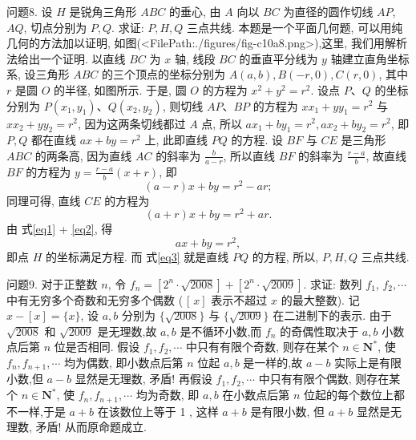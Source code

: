 问题8. 设 $H$ 是锐角三角形 $A B C$ 的垂心, 由 $A$ 向以 $B C$ 为直径的圆作切线 $A P$, $A Q$, 切点分别为 $P, Q$. 求证: $P, H, Q$ 三点共线.
本题是一个平面几何题, 可以用纯几何的方法加以证明, 如图(<FilePath:./figures/fig-c10a8.png>),这里, 我们用解析法给出一个证明.
以直线 $B C$ 为 $x$ 轴, 线段 $B C$ 的垂直平分线为 $y$ 轴建立直角坐标系, 设三角形 $A B C$ 的三个顶点的坐标分别为 $A(a, b), B(-r, 0), C(r, 0)$, 其中 $r$ 是圆 $O$ 的半径, 如图所示.
于是, 圆 $O$ 的方程为 $x^2+y^2=r^2$.
设点 $P 、 Q$ 的坐标分别为 $P\left(x_1, y_1\right) 、 Q\left(x_2, y_2\right)$, 则切线 $A P 、 B P$ 的方程为 $x x_1+y y_1=r^2$ 与 $x x_2+y y_2=r^2$, 因为这两条切线都过 $A$ 点, 所以 $a x_1+ b y_1=r^2, a x_2+b y_2=r^2$, 即 $P, Q$ 都在直线 $a x+b y=r^2$ 上, 此即直线 $P Q$ 的方程.
设 $B F$ 与 $C E$ 是三角形 $A B C$ 的两条高, 因为直线 $A C$ 的斜率为 $\frac{b}{a-r}$, 所以直线 $B F$ 的斜率为 $\frac{r-a}{b}$, 故直线 $B F$ 的方程为 $y=\frac{r-a}{b}(x+r)$, 即
$$
(a-r) x+b y=r^2-a r ; \label{eq1}
$$
同理可得, 直线 $C E$ 的方程为
$$
(a+r) x+b y=r^2+a r . \label{eq2}
$$
由 式\ref{eq1} + \ref{eq2}, 得
$$
a x+b y=r^2, \label{eq3}
$$
即点 $H$ 的坐标满足方程.
而 式\ref{eq3} 就是直线 $P Q$ 的方程, 所以, $P, H, Q$ 三点共线.



问题9. 对于正整数 $n$, 令 $f_n=\left[2^n \cdot \sqrt{2008}\right]+\left[2^n \cdot \sqrt{2009}\right]$. 求证: 数列 $f_1$, $f_2, \cdots$ 中有无穷多个奇数和无穷多个偶数 ( [ $\left.x\right]$ 表示不超过 $x$ 的最大整数). 
记 $x-[x]=\{x\}$, 设 $a, b$ 分别为 $\{\sqrt{2008}\}$ 与 $\{\sqrt{2009}\}$ 在二进制下的表示.
由于 $\sqrt{2008}$ 和 $\sqrt{2009}$ 是无理数,故 $a, b$ 是不循环小数,而 $f_n$ 的奇偶性取决于 $a, b$ 小数点后第 $n$ 位是否相同.
假设 $f_1, f_2, \cdots$ 中只有有限个奇数, 则存在某个 $n \in \mathbf{N}^*$, 使 $f_n, f_{n+1}, \cdots$ 均为偶数, 即小数点后第 $n$ 位起 $a, b$ 是一样的,故 $a-b$ 实际上是有限小数,但
$a-b$ 显然是无理数, 矛盾! 再假设 $f_1, f_2, \cdots$ 中只有有限个偶数, 则存在某个 $n \in \mathbf{N}^*$, 使 $f_n, f_{n+1}, \cdots$ 均为奇数, 即 $a, b$ 在小数点后第 $n$ 位起的每个数位上都不一样,于是 $a+b$ 在该数位上等于 1 , 这样 $a+b$ 是有限小数, 但 $a+b$ 显然是无理数, 矛盾!
从而原命题成立.


